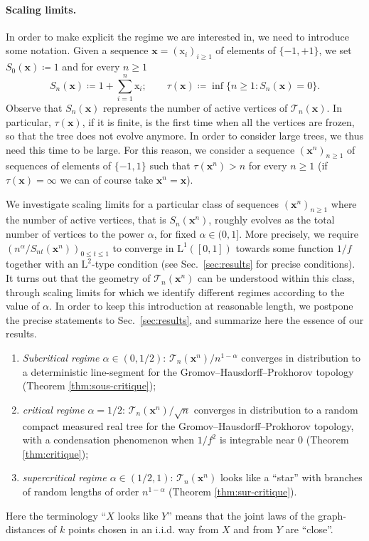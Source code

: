 \documentclass[11pt]{article}
\theoremstyle{plain}
\theoremstyle{definition}
\theoremstyle{remark}
\newcommand{\1}{\mathbbm{1}} %
\newcommand{\T}{\mathcal{T}} %
\newcommand{\Xb}{\mathrm{\mathbf{x}}} %
\newcommand{\X}{\mathrm x} %
\begin{document}
\paragraph{Scaling limits.} In order to make explicit the regime we are interested in, we need to introduce some notation. Given  a sequence $\Xb=(\X_i)_{i \geq 1}$  of elements of $\{-1,+1\}$, we set $S_{0}(\Xb) \coloneqq1$ and for every $n \geq 1$
\begin{equation}
\label{eq:defintro}S_n(\Xb) \coloneqq 1+ \sum_{i=1}^n \X_i; \qquad \tau(\Xb) \coloneqq \inf \{n \geq 1 : S_{n}(\Xb)=0\}.
\end{equation}
Observe that $S_{n}(\Xb)$ represents the number of active vertices of $\T_{n}(\Xb)$. In particular, $\tau(\Xb)$, if it is finite, is the first time when all the vertices are frozen, so that the tree does not evolve anymore. In order to consider large trees, we thus need this time to be large.  For this reason, we consider a sequence $(\Xb^n)_{n \geq 1}$ of sequences of elements of $\{-1,1\}$ such that $\tau(\Xb^n)>n$ for every $n \geq 1$ (if $\tau(\Xb)=\infty$ we can of course take $\Xb^{n}=\Xb$).


We investigate scaling limits for a particular class of sequences $(\Xb^{n})_{n \geq 1}$ where  the number of active vertices, that is $S_{n}(\Xb^{n})$, roughly evolves  as the total number of vertices to the power $\alpha$, for fixed $\alpha \in (0,1]$. {More precisely, we require $\displaystyle (n^{\alpha}/S_{nt}(\Xb^n))_{0 \leq t \leq 1}$ to converge in $\mathrm{L}^1([0,1])$ towards some function $1/f$ together with an $\mathrm{L}^2$-type condition} (see Sec.~\ref{sec:results} for precise conditions). It turns out that the geometry of $\T_{n}(\Xb^{n})$ can be understood within this class, through scaling limits for which we identify different regimes according to the value of $\alpha$. In order to keep this introduction at reasonable length, we postpone the precise statements to Sec.~\ref{sec:results}, and summarize here the essence of our results. 
 \begin{enumerate}
 \item[--] \emph{Subcritical regime $\alpha \in (0,1/2)$}:  $ \T_{n}(\Xb^{n})/n^{1-\alpha}$ converges in distribution to a deterministic line-segment for the Gromov--Hausdorff--Prokhorov topology (Theorem \ref{thm:sous-critique});
 \item[--] \emph{critical regime $\alpha=1/2$}: $\T_{n}(\Xb^{n})/ \sqrt{n}$ converges in distribution to a random compact measured real tree for the Gromov--Hausdorff--Prokhorov topology, with a condensation phenomenon when $1/{f^{2}}$ is integrable near $0$ (Theorem \ref{thm:critique});
 \item[--] \emph{supercritical regime $\alpha \in (1/2,1)$}:  $ \T_{n}(\Xb^{n})$ looks like a ``star''  with  branches of random lengths of order $n^{1-\alpha}$ (Theorem \ref{thm:sur-critique}).
 \end{enumerate}
 Here the terminology ``$X$ looks like $Y$'' means that the joint laws of the graph-distances of $k$ points chosen in an i.i.d. way from $X$ and from $Y$ are ``close''.
 
\end{document}
